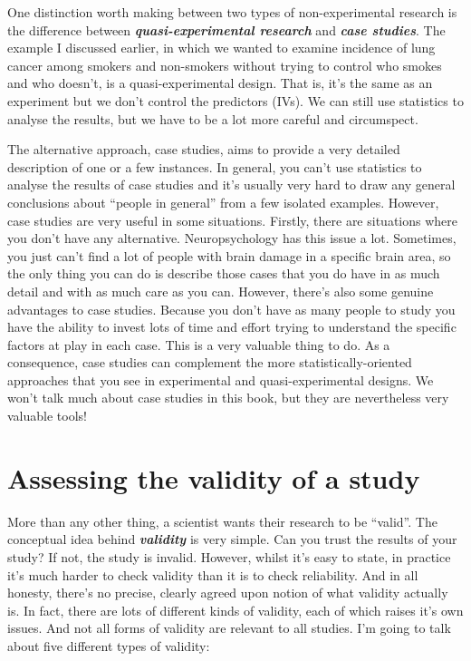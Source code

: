 \documentclass[
]{book}
\begin{document}
One distinction worth making between two types of non-experimental research is the difference between \textbf{\emph{quasi-experimental research}} and \textbf{\emph{case studies}}. The example I discussed earlier, in which we wanted to examine incidence of lung cancer among smokers and non-smokers without trying to control who smokes and who doesn't, is a quasi-experimental design. That is, it's the same as an experiment but we don't control the predictors (IVs). We can still use statistics to analyse the results, but we have to be a lot more careful and circumspect.

The alternative approach, case studies, aims to provide a very detailed description of one or a few instances. In general, you can't use statistics to analyse the results of case studies and it's usually very hard to draw any general conclusions about ``people in general'' from a few isolated examples. However, case studies are very useful in some situations. Firstly, there are situations where you don't have any alternative. Neuropsychology has this issue a lot. Sometimes, you just can't find a lot of people with brain damage in a specific brain area, so the only thing you can do is describe those cases that you do have in as much detail and with as much care as you can. However, there's also some genuine advantages to case studies. Because you don't have as many people to study you have the ability to invest lots of time and effort trying to understand the specific factors at play in each case. This is a very valuable thing to do. As a consequence, case studies can complement the more statistically-oriented approaches that you see in experimental and quasi-experimental designs. We won't talk much about case studies in this book, but they are nevertheless very valuable tools!

\hypertarget{validity}{%
\section{Assessing the validity of a study}\label{validity}}

More than any other thing, a scientist wants their research to be ``valid''. The conceptual idea behind \textbf{\emph{validity}} is very simple. Can you trust the results of your study? If not, the study is invalid. However, whilst it's easy to state, in practice it's much harder to check validity than it is to check reliability. And in all honesty, there's no precise, clearly agreed upon notion of what validity actually is. In fact, there are lots of different kinds of validity, each of which raises it's own issues. And not all forms of validity are relevant to all studies. I'm going to talk about five different types of validity:
\end{document}
